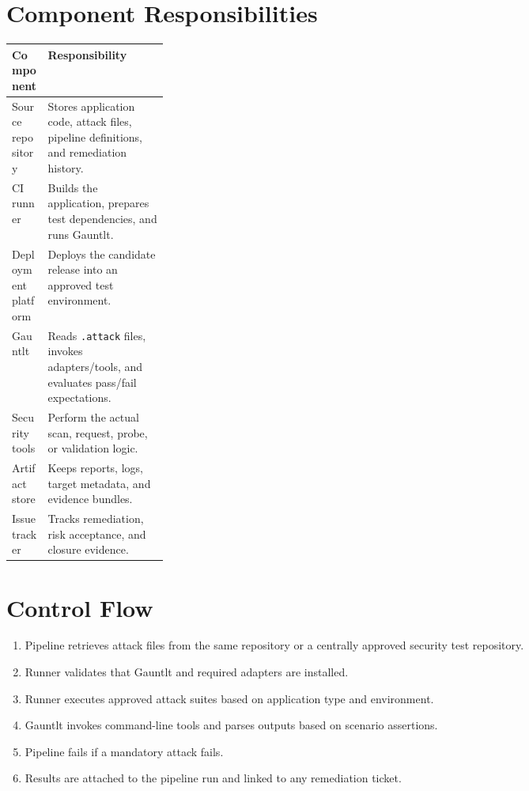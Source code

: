 \documentclass[11pt]{article}
\begin{document}
\section{Component Responsibilities}
\begin{tabularx}{\linewidth}{@{}L{0.23\linewidth}Y@{}}
\toprule
\textbf{Component} & \textbf{Responsibility} \\
\midrule
Source repository & Stores application code, attack files, pipeline definitions, and remediation history. \\
CI runner & Builds the application, prepares test dependencies, and runs Gauntlt. \\
Deployment platform & Deploys the candidate release into an approved test environment. \\
Gauntlt & Reads \texttt{.attack} files, invokes adapters/tools, and evaluates pass/fail expectations. \\
Security tools & Perform the actual scan, request, probe, or validation logic. \\
Artifact store & Keeps reports, logs, target metadata, and evidence bundles. \\
Issue tracker & Tracks remediation, risk acceptance, and closure evidence. \\
\bottomrule
\end{tabularx}

\section{Control Flow}
\begin{enumerate}
  \item Pipeline retrieves attack files from the same repository or a centrally approved security test repository.
  \item Runner validates that Gauntlt and required adapters are installed.
  \item Runner executes approved attack suites based on application type and environment.
  \item Gauntlt invokes command-line tools and parses outputs based on scenario assertions.
  \item Pipeline fails if a mandatory attack fails.
  \item Results are attached to the pipeline run and linked to any remediation ticket.
\end{enumerate}
\end{document}
